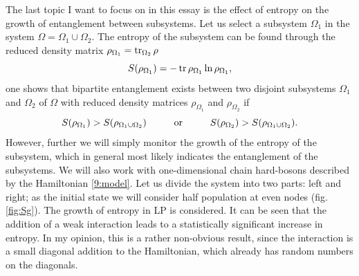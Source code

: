 The last topic I want to focus on in this essay is the effect of entropy on the growth of entanglement between subsystems. Let us select a subsystem $\Omega_1$ in the system $\Omega = \Omega_1 \cup \Omega_2$. The entropy of the subsystem can be found through the reduced density matrix $\rho_{\Omega_1} = \mathop{\mathrm{tr}}\nolimits_{\Omega_2} \rho$
\begin{equation*}
     S(\rho_{\Omega_1}) = - \mathop{\mathrm{tr}}\nolimits \rho_{\Omega_1} \ln \rho_{\Omega_1},
\end{equation*}
one shows that bipartite entanglement exists between two disjoint subsystems $\Omega_1$ and $\Omega_2$ of $\Omega$ with reduced density matrices $\rho_{\Omega_1}$ and $\rho_{\Omega_2}$ if
\begin{equation*}
     S(\rho_{\Omega_1}) > S(\rho_{\Omega_1 \cup \Omega_2})
     \hspace{10 mm} \text{or} \hspace{10 mm}
     S(\rho_{\Omega_2}) > S(\rho_{\Omega_1 \cup \Omega_2}).
\end{equation*}
However, further we will simply monitor the growth of the entropy of the subsystem, which in general most likely indicates the entanglement of the subsystems. We will also work with one-dimensional chain hard-bosons described by the Hamiltonian \eqref{9:model}. Let us divide the system into two parts: left and right; as the initial state we will consider half population at even nodes (fig. \ref{fig:Sg}).  The growth of entropy in LP is considered. It can be seen that the addition of a weak interaction leads to a statistically significant increase in entropy. In my opinion, this is a rather non-obvious result, since the interaction is a small diagonal addition to the Hamiltonian, which already has random numbers on the diagonals.



